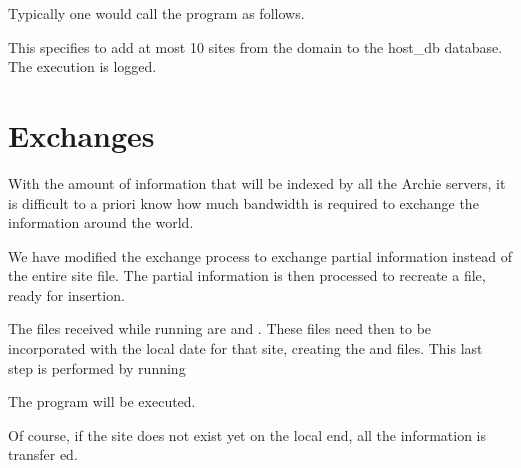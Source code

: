 Typically one would call the program as follows.


This specifies to add at most 10 sites from the domain  to the
host_db database. The execution is logged.

\section{Exchanges}

With the amount of information that will be indexed by all the Archie servers,
it is difficult to a priori know how much bandwidth is required to exchange
the information around the world.

We have modified the exchange process to exchange partial information
instead of the entire  site file. The partial information is then processed
to recreate a  file, ready for insertion.

The files received  while running   are
 and . These files need then to
be incorporated with the local date for that site, creating the
 and  files.
This last step is performed by running


The program  will be executed.

Of course, if the site does not exist yet on the local end, all the
information is transfer ed.





